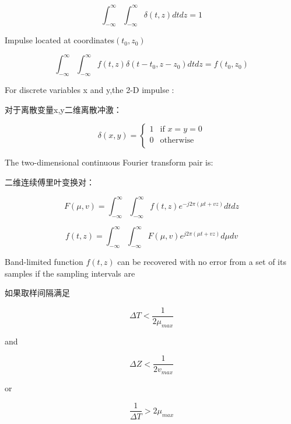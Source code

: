 \documentclass[12pt]{article}
\numberwithin{equation}{section}%
\begin{document}
\begin{equation} \label{4.17}
\int_{-\infty}^{\infty}\int_{-\infty}^{\infty}\delta(t,z)dtdz=1
\end{equation}

Impulse located at coordinates$(t_{0},z_{0})$

\begin{equation} \label{4.18}
\int_{-\infty}^{\infty}\int_{-\infty}^{\infty}f(t,z)\delta(t-t_{0},z-z_{0})dtdz=f(t_{0},z_{0})
\end{equation}

For discrete variables x and y,the 2-D impulse :

对于离散变量x,y二维离散冲激：

\begin{equation} \label{4.19}
\delta(x,y) = \left\{ \begin{array}{ll}
1 & \textrm{if $x=y=0$}\\
0 & \textrm{otherwise}\\
\end{array} \right.
\end{equation}

The two-dimensional continuous Fourier transform pair is:

二维连续傅里叶变换对：

\begin{equation} \label{4.20}
F(\mu,v)=\int_{-\infty}^{\infty}\int_{-\infty}^{\infty}f(t,z)e^{-j2\pi (\mu t+vz)}dtdz
\end{equation}

\begin{equation} \label{4.21}
f(t,z)=\int_{-\infty}^{\infty}\int_{-\infty}^{\infty}F(\mu,v)e^{j2\pi (\mu t+vz)}d\mu dv
\end{equation}

Band-limited function $f(t,z)$ can be recovered with no error from a set of its samples if the sampling intervals are 

如果取样间隔满足

\begin{equation} \label{4.22}
\Delta T<\frac{1}{2\mu_{max}}
\end{equation}

and 

\begin{equation} \label{4.23}
\Delta Z<\frac{1}{2v_{max}}
\end{equation}

or

\begin{equation} \label{4.24}
\frac{1}{\Delta T}>2\mu_{max}
\end{equation}
\end{document}
